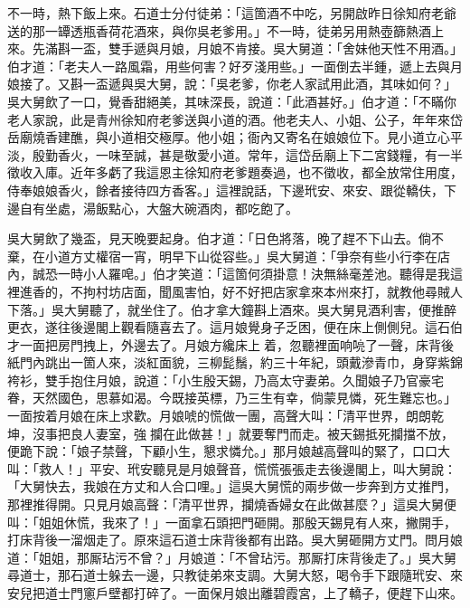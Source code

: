 不一時，熱下飯上來。石道士分付徒弟：「這箇酒不中吃，另開啟昨日徐知府老爺送的那一罈透瓶香荷花酒來，與你吳老爹用。」不一時，徒弟另用熱壺篩熱酒上來。先滿斟一盃，雙手遞與月娘，{}月娘不肯接。吳大舅道：「舍妹他天性不用酒。」伯才道：「老夫人一路風霜，用些何害？好歹淺用些。」一面倒去半鍾，遞上去與月娘接了。又斟一盃遞與吳大舅，說：「吳老爹，你老人家試用此酒，其味如何？」吳大舅飲了一口，覺香甜絕美，其味深長，說道：「此酒甚好。」伯才道：「不瞞你老人家說，此是青州徐知府老爹送與小道的酒。他老夫人、小姐、公子，年年來岱岳廟燒香建醮，與小道相交極厚。他小姐；衙內又寄名在娘娘位下。見小道立心平淡，殷勤香火，一味至誠，甚是敬愛小道。常年，這岱岳廟上下二宮錢糧，有一半徵收入庫。近年多虧了我這恩主徐知府老爹題奏過，也不徵收，都全放常住用度，侍奉娘娘香火，餘者接待四方香客。」{}這裡說話，下邊玳安、來安、跟從轎伕，下邊自有坐處，湯飯點心，大盤大碗酒肉，都吃飽了。

吳大舅飲了幾盃，見天晚要起身。伯才道：「日色將落，晚了趕不下山去。{}倘不棄，在小道方丈權宿一宵，明早下山從容些。」吳大舅道：「爭奈有些小行李在店內，誠恐一時小人羅唣。」伯才笑道：「這箇何須掛意！決無絲毫差池。聽得是我這裡進香的，不拘村坊店面，聞風害怕，好不好把店家拿來本州來打，就教他尋賊人下落。」{}吳大舅聽了，就坐住了。伯才拿大鐘斟上酒來。吳大舅見酒利害，便推醉更衣，{}遂往後邊閣上觀看隨喜去了。這月娘覺身子乏困，便在床上側側兒。這石伯才一面把房門拽上，外邊去了。月娘方纔床上𢱉着，忽聽裡面响喨了一聲，床背後紙門內跳出一箇人來，淡紅面貌，三柳髭鬚，約三十年紀，頭戴滲青巾，身穿紫錦袴衫，雙手抱住月娘，說道：「小生殷天錫，乃高太守妻弟。久聞娘子乃官豪宅眷，天然國色，思慕如渴。今既接英標，乃三生有幸，倘蒙見憐，死生難忘也。」{}一面按着月娘在床上求歡。月娘唬的慌做一團，高聲大叫：「清平世界，朗朗乾坤，沒事把良人妻室，強𢺞攔在此做甚！」就要奪門而走。被天錫抵死攔擋不放，便跪下說：「娘子禁聲，下顧小生，懇求憐允。」{}那月娘越高聲叫的緊了，口口大叫：「救人！」平安、玳安聽見是月娘聲音，慌慌張張走去後邊閣上，叫大舅說：「大舅快去，我娘在方丈和人合口哩。」這吳大舅慌的兩步做一步奔到方丈推門，那裡推得開。只見月娘高聲：「清平世界，攔燒香婦女在此做甚麼？」這吳大舅便叫：「姐姐休慌，我來了！」一面拿石頭把門砸開。那殷天錫見有人來，撇開手，打床背後一溜烟走了。原來這石道士床背後都有出路。吳大舅砸開方丈門。問月娘道：「姐姐，那厮玷污不曾？」月娘道：「不曾玷污。那厮打床背後走了。」吳大舅尋道士，那石道士躲去一邊，只教徒弟來支調。大舅大怒，喝令手下跟隨玳安、來安兒把道士門窻戶壁都打碎了。一面保月娘出離碧霞宮，上了轎子，便趕下山來。

